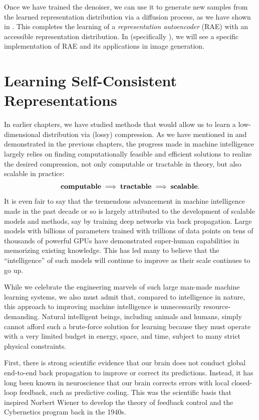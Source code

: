 \documentclass[../../book-main.tex]{subfiles}
\begin{document}
Once we have trained the denoiser, we can use it to generate new samples from
the learned representation distribution via a diffusion process, as we have
shown in . This completes the learning of
a \textit{representation autoencoder} (RAE) with an accessible
representation distribution.
In  (specifically ), we will see a specific implementation of
RAE and its applications in image generation.

\section{Learning Self-Consistent Representations}
\label{sec:self-consistency}

In earlier chapters, we have studied methods that would allow us to
learn a low-dimensional distribution via (lossy) compression. As we
have mentioned in  and demonstrated in the previous
chapters, the progress made in machine intelligence largely relies on
finding computationally feasible and efficient solutions to realize
the desired compression, not only computable or tractable in theory,
but also scalable in practice:
\begin{equation}
    \mbox{\textbf{computable}} \;
    \Longrightarrow \; \mbox{\textbf{tractable}} \; \Longrightarrow \;
    \mbox{\textbf{scalable}}.
\end{equation}
It is even fair to say that the tremendous advancement in machine
intelligence made in the past decade or so is largely attributed to
the development of scalable models and methods, say by training deep
networks via back propagation. Large models with billions of
parameters trained with trillions of data points on tens of thousands
of powerful GPUs have demonstrated super-human capabilities in
memorizing existing knowledge. This has led many to believe that the
``intelligence'' of such models will continue to improve as their
scale continues to go up.

While we celebrate the engineering marvels of such large man-made
machine learning systems, we also must admit that, compared to
intelligence in nature, this approach to improving machine
intelligence is unnecessarily resource-demanding. Natural intelligent
beings, including animals and humans, simply cannot afford such a
brute-force solution for learning because they must operate with a
very limited budget in energy, space, and time, subject to many
strict physical constraints.

First, there is strong scientific evidence that our brain does not
conduct global end-to-end back propagation to improve or correct its
predictions. Instead, it has long been known in neuroscience that our
brain corrects errors with local closed-loop feedback, such as
predictive coding. This was the scientific basis that inspired
Norbert Wiener to develop the theory of feedback control and the
Cybernetics program back in the 1940s.
\end{document}
